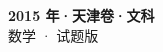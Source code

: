 \documentclass[zihao=-4, a4paper]{ctexart}
\begin{document}
\begin{center}
  {\Large\bfseries 2015 年·天津卷·文科}\\[4pt]
  {\large 数学 · 试题版}
\end{center}
\medskip
{}

\end{document}
